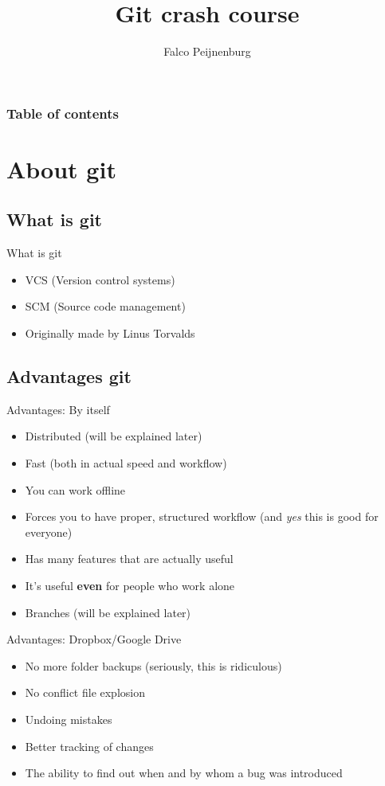 \documentclass[10pt,a4paper]{beamer}
\author{Falco Peijnenburg}
\title[Git crash course\hspace{40mm} \insertframenumber/\inserttotalframenumber]{Git crash course}
\begin{document}
\frame{\titlepage}

\setcounter{tocdepth}{1}
\begin{frame}
\frametitle{Table of contents}
\tableofcontents[]
\end{frame}


\section{About git}
\subsection{What is git}
\begin{frame}{What is git}
\begin{itemize}
\item VCS (Version control systems)
\item SCM (Source code management)
\item Originally made by Linus Torvalds
\end{itemize}
\end{frame}

\subsection{Advantages git}

\begin{frame}{Advantages: By itself}
\begin{itemize}
\item Distributed (will be explained later)
\item Fast (both in actual speed and workflow)
\item You can work offline
\item Forces you to have proper, structured workflow (and \textit{yes} this is good for everyone)
\item Has many features that are actually useful
\item It's useful \textbf{even} for people who work alone
\item Branches (will be explained later)

\end{itemize}
\end{frame}

\begin{frame}{Advantages: Dropbox/Google Drive}
\begin{itemize}
\item No more folder backups (seriously, this is ridiculous)
\item No conflict file explosion
\item Undoing mistakes
\item Better tracking of changes
\item The ability to find out when and by whom a bug was introduced
\end{itemize}
\end{frame}
\end{document}
